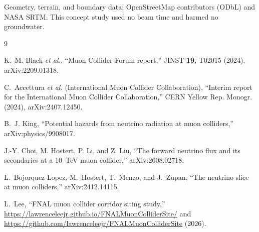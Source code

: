 \documentclass[aps,prl,reprint,superscriptaddress,nofootinbib]{revtex4-2}
\begin{document}
\begin{acknowledgments}
Geometry, terrain, and boundary data: OpenStreetMap contributors (ODbL)
and NASA SRTM. This concept study used no beam time and harmed no
groundwater.
\end{acknowledgments}

\begin{thebibliography}{9}

K.~M. Black \emph{et al.}, ``Muon Collider Forum report,''
JINST \textbf{19}, T02015 (2024), arXiv:2209.01318.

C.~Accettura \emph{et al.} (International Muon Collider Collaboration),
``Interim report for the International Muon Collider Collaboration,''
CERN Yellow Rep. Monogr. (2024), arXiv:2407.12450.

B.~J. King, ``Potential hazards from neutrino radiation at muon
colliders,'' arXiv:physics/9908017.

J.-Y. Choi, M. Hostert, P. Li, and Z. Liu,
``The forward neutrino flux and its secondaries at a 10~TeV muon
collider,'' arXiv:2608.02718.

L.~Bojorquez-Lopez, M.~Hostert, T.~Menzo, and J.~Zupan,
``The neutrino slice at muon colliders,'' arXiv:2412.14115.

L.~Lee, ``FNAL muon collider corridor siting study,''
\url{https://lawrenceleejr.github.io/FNALMuonColliderSite/} and
\url{https://github.com/lawrenceleejr/FNALMuonColliderSite} (2026).

\end{thebibliography}
\end{document}
